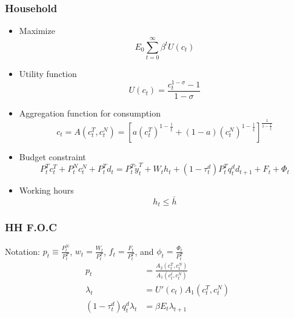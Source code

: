 \documentclass[mathserif]{beamer}
\begin{document}
    \begin{frame}
        \frametitle{Household}
        \begin{itemize}
            \item Maximize
                \begin{equation}
                    E_0 \sum_{t=0}^\infty \beta^t U(c_t)
                \end{equation}
            \item Utility function
                \begin{equation}
                    U(c_t) = \frac{c_t^{1-\sigma} - 1}{1 - \sigma}
                \end{equation}
            \item Aggregation function for consumption
                \begin{equation}
                    \label{eq:aggregator-function}
                    c_t = A(c^T_t, c^N_t) =
                        \left[ a \left( c^T_t \right)^{1- \frac{1}{\xi}} +
                            (1 - a) \left( c^N_t \right)^{1- \frac{1}{\xi}}
                        \right]^{\frac{1}{1 - \frac{1}{\xi}}}
                \end{equation}
            \item Budget constraint
                \begin{equation}
                    \label{eq:bc}
                    P^T_t c^T_t + P^N_t c^N_t + P^T_t d_t =
                    P^T_t \tilde{y}^T_t + W_t h_t + (1- \tau^d_t)P^T_t q^d_t d_{t+1} + F_t + \Phi_t
                \end{equation}
            \item Working hours
                \begin{equation}
                    \label{eq:h-constraint}
                    h_t \le \bar{h}
                \end{equation}
        \end{itemize}
    \end{frame}

    \begin{frame}
        \frametitle{HH F.O.C}
        Notation:
$p_t \equiv \frac{P^N_t}{P^T_t}$, $w_t = \frac{W_t}{P^T_t}$, $f_t = \frac{F_t}{P^T_t}$, and $\phi_t = \frac{\Phi_t}{P^T_t}$
            \begin{subequations}
                \begin{align}
                    p_t &= \frac{A_2(c_t^T, c_t^N)}{A_1(c_t^t, c_t^N)} \label{eq:FOC-HH-1} \\
                    \lambda_t &= U'(c_t)A_1(c_t^T, c_t^N)\\
                    (1-\tau_t^d)q_t^d \lambda_t &= \beta E_t \lambda_{t+1}
                \end{align}
            \end{subequations}
    \end{frame}
\end{document}
